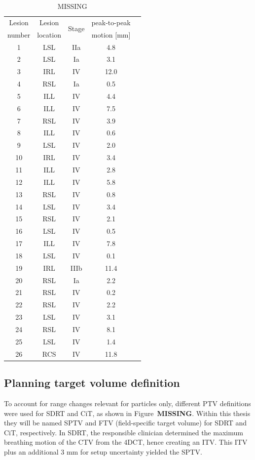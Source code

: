 \documentclass[type=dr, dr=rernat, accentcolor=tud7b,colorbacktitle, bigchapter, openright, twoside, 12pt ]{tudthesis}
\begin{document}
\begin{table}[H]
  \centering
  \caption{MISSING}
  \begin{tabular}{|c|c|c|c|c|}
    \hline\hline
    Lesion & Lesion & \multirow{2}{*}{Stage} &
    peak-to-peak \\
    number & location & & motion [mm] \\
    \hline
    1 & LSL & IIa & 4.8  \\
    2 & LSL & Ia & 3.1 \\
    3 & IRL & IV & 12.0 \\
    4 & RSL & Ia & 0.5 \\
    5 & ILL & IV & 4.4 \\
    6 & ILL & IV & 7.5 \\
    7 & RSL & IV & 3.9 \\
    8 & ILL & IV & 0.6 \\
    9 & LSL & IV & 2.0 \\
    10 & IRL & IV & 3.4 \\
    11 & ILL & IV & 2.8 \\
    12 & ILL & IV & 5.8 \\
    13 & RSL & IV & 0.8 \\
    14 & LSL & IV & 3.4 \\
    15 & RSL & IV & 2.1 \\
    16 & LSL & IV & 0.5 \\
    17 & ILL & IV & 7.8 \\
    18 & LSL & IV & 0.1 \\
    19 & IRL & IIIb & 11.4 \\
    20 & RSL & Ia & 2.2 \\
    21 & RSL & IV & 0.2 \\
    22 & RSL & IV & 2.2 \\
    23 & LSL & IV & 3.1 \\
    24 & RSL & IV & 8.1 \\
    25 & LSL & IV & 1.4 \\
    26 & RCS & IV & 11.8 \\
    \hline\hline
  \end{tabular}
  \label{tab:patdata}
\end{table}

\subsection{Planning target volume definition}

To account for range changes relevant for particles only, different PTV definitions were used for SDRT and CiT, as shown in Figure~\textbf{MISSING}. 
Within this thesis they will be named SPTV and FTV (field-specific target volume) for SDRT and CiT, respectively.
In SDRT, the responsible clinician determined the maximum breathing motion of the CTV from the 4DCT, hence creating an ITV. This ITV plus an additional 3 mm for setup uncertainty yielded the SPTV.
\end{document}
